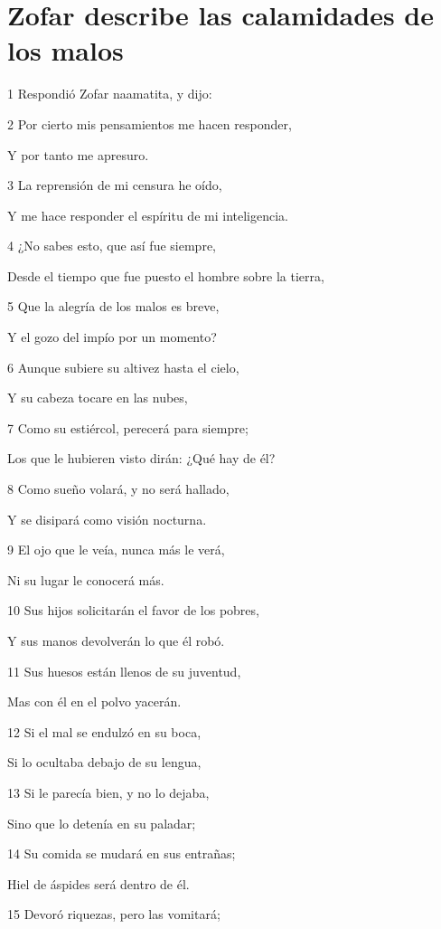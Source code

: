 \section*{Zofar describe las calamidades de los malos}

\par 1 Respondió Zofar naamatita, y dijo:
\par 2 Por cierto mis pensamientos me hacen responder,
\par Y por tanto me apresuro.
\par 3 La reprensión de mi censura he oído,
\par Y me hace responder el espíritu de mi inteligencia.
\par 4 ¿No sabes esto, que así fue siempre,
\par Desde el tiempo que fue puesto el hombre sobre la tierra,
\par 5 Que la alegría de los malos es breve,
\par Y el gozo del impío por un momento?
\par 6 Aunque subiere su altivez hasta el cielo,
\par Y su cabeza tocare en las nubes,
\par 7 Como su estiércol, perecerá para siempre;
\par Los que le hubieren visto dirán: ¿Qué hay de él?
\par 8 Como sueño volará, y no será hallado,
\par Y se disipará como visión nocturna.
\par 9 El ojo que le veía, nunca más le verá,
\par Ni su lugar le conocerá más.
\par 10 Sus hijos solicitarán el favor de los pobres,
\par Y sus manos devolverán lo que él robó. 
\par 11 Sus huesos están llenos de su juventud,
\par Mas con él en el polvo yacerán.
\par 12 Si el mal se endulzó en su boca,
\par Si lo ocultaba debajo de su lengua,
\par 13 Si le parecía bien, y no lo dejaba,
\par Sino que lo detenía en su paladar;
\par 14 Su comida se mudará en sus entrañas;
\par Hiel de áspides será dentro de él.
\par 15 Devoró riquezas, pero las vomitará;
